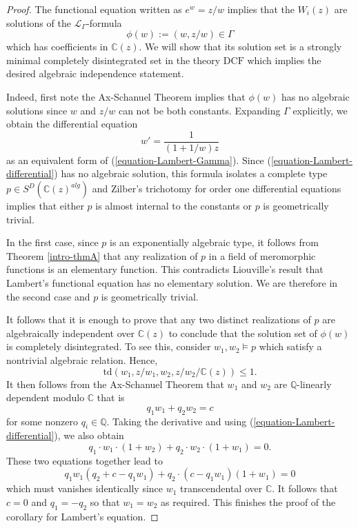 \documentclass[12pt]{amsart}
\theoremstyle{definition}
\theoremstyle{plain}
\theoremstyle{exampstyle}\newtheorem{thmx}{Theorem}
\theoremstyle{exampstyle}\newtheorem{thmxbis}{Theorem}
\begin{document}
\begin{proof} 
The functional equation  written as $e^{w} = z/w$ implies that the $W_i(z)$ are solutions of the  $\mathcal L_\Gamma$-formula
\begin{equation}\label{equation-Lambert-Gamma}
\phi(w) := (w,z/w) \in \Gamma 
\end{equation} 
which has coefficients in $\mathbb{C}(z)$. We will show that its solution set is a strongly minimal completely disintegrated set in the theory $\mathrm{DCF}$ which implies the desired algebraic independence statement. 

Indeed, first note the Ax-Schanuel Theorem implies that $\phi(w)$ has no algebraic solutions since $w$ and $z/w$ can not be both constants. Expanding $\Gamma$ explicitly, we obtain the differential equation
\begin{equation}\label{equation-Lambert-differential}
w' = \frac {1}  {(1+1/w)z}
\end{equation}
as an equivalent form of (\ref{equation-Lambert-Gamma}). Since (\ref{equation-Lambert-differential}) has no algebraic solution, this formula isolates a complete type $p \in S^{D}(\mathbb{C}(z)^{alg})$ and Zilber's trichotomy \cite{Hrushovski-Sokolovic} for order one differential equations implies that either $p$ is almost internal to the constants or $p$ is geometrically trivial. 

In the first case, since $p$ is an exponentially algebraic type, it follows from Theorem \ref{intro-thmA} that any realization of $p$ in a field of meromorphic functions is an elementary function. This contradicts Liouville's result that Lambert's functional equation has no elementary solution. We are therefore in the second case and $p$ is geometrically trivial.

It follows that it is enough to prove that any two distinct realizations of $p$ are  algebraically independent over $\mathbb{C}(z)$ to conclude that the solution set of $\phi(w)$ is completely disintegrated. To see this, consider $w_1,w_2 \models p$ which satisfy a nontrivial algebraic relation. Hence,
$$ \mathrm{td}(w_1, z/w_1, w_2, z/w_2 /\mathbb{C}(z)) \leq 1.$$ 
It then follows from the Ax-Schanuel Theorem that $w_1$ and $w_2$ are $\mathbb{Q}$-linearly dependent modulo $\mathbb{C}$ that is
$$q_1 w_1 + q_2 w_2 = c$$ 
for some nonzero $q_i \in \mathbb{Q}$. Taking the derivative and using (\ref{equation-Lambert-differential}), we also obtain 
$$ q_1 \cdot {w_1} \cdot (1 + w_2) + q_2 \cdot {w_2}\cdot (1 + w_1) = 0 .$$
These two equations together lead to 
$$ q_1 w_1 (q_2 + c - q_1 w_1) + q_2\cdot (c - q_1 w_1) (1 + w_1) = 0  $$ 
which must vanishes identically since $w_1$ transcendental over $\mathbb{C}$. It follows that $c = 0$ and $q_1 = -q_2$ so that $w_1 = w_2$ as required. This finishes the proof of the corollary for Lambert's equation.
\end{proof}
\end{document}
